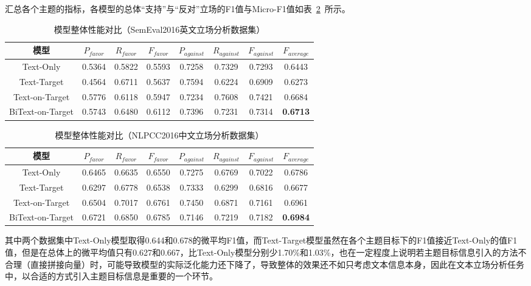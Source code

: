 汇总各个主题的指标，各模型的总体“支持”与“反对”立场的F1值与Micro-F1值如表~\ref{semeval_all_model}~所示。
\begin{table}[htbp]
	\caption[table123]{模型整体性能对比（SemEval2016英文立场分析数据集）}
	\label{semeval_all_model}
	\vspace{0.5em}\centering\wuhao
	\begin{tabular}{cccccccc}
		\toprule[1.5pt]
		模型& $P_{favor}$&$R_{favor}$&$F_{favor}$&$P_{against}$&$R_{against}$&$F_{against}$&$F_{average}$ \\
		\midrule[1pt]
		Text-Only&0.5364&0.5822&0.5593&0.7258&0.7329&0.7293&0.6443\\
		Text-Target&0.4564&0.6711&0.5637&0.7594&0.6224&0.6909&0.6273\\
		Text-on-Target&0.5776&0.6118&0.5947&0.7234&0.7608&0.7421&0.6684\\
		BiText-on-Target&0.5743&0.6480&0.6112&0.7396&0.7231&0.7314&\textbf{0.6713}\\
		\bottomrule[1.5pt]
	\end{tabular}
\end{table}

\begin{table}[htbp]
	\caption[table123]{模型整体性能对比（NLPCC2016中文立场分析数据集）}
	\label{semeval_all_model}
	\vspace{0.5em}\centering\wuhao
	\begin{tabular}{cccccccc}
		\toprule[1.5pt]
		模型& $P_{favor}$&$R_{favor}$&$F_{favor}$&$P_{against}$&$R_{against}$&$F_{against}$&$F_{average}$ \\
		\midrule[1pt]
		Text-Only&0.6465&0.6635&0.6550&0.7275&0.6769&0.7022&0.6786\\
		Text-Target&0.6297&0.6778&0.6538&0.7333&0.6299&0.6816&0.6677\\
		Text-on-Target&0.6504&0.7017&0.6761&0.7450&0.6871&0.7161&0.6961\\
		BiText-on-Target&0.6721&0.6850&0.6785&0.7146&0.7219&0.7182&\textbf{0.6984}\\
		\bottomrule[1.5pt]
	\end{tabular}
\end{table}

其中两个数据集中Text-Only模型取得0.644和0.678的微平均F1值，而Text-Target模型虽然在各个主题目标下的F1值接近Text-Only的值F1值，但是在总体上的微平均值只有0.627和0.667，比Text-Only模型分别少1.70\%和1.03\%，也在一定程度上说明若主题目标信息引入的方法不合理（直接拼接向量）时，可能导致模型的实际泛化能力还下降了，导致整体的效果还不如只考虑文本信息本身，因此在文本立场分析任务中，以合适的方式引入主题目标信息是重要的一个环节。


